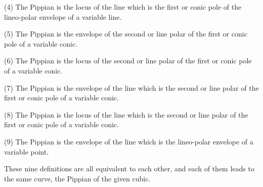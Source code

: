 \documentclass[12pt,a4paper]{article}
\theoremstyle{definition}
\begin{document}
\hspace*{2em}(4) The Pippian is the locus of the line which is the first
or conic pole of the lineo-polar envelope of a variable line.

\hspace*{2em}(5) The Pippian is the envelope of the second or line polar
of the first or conic pole of a variable conic.

\hspace*{2em}(6) The Pippian is the locus of the second or line polar of
the first or conic pole of a variable conic.

\hspace*{2em}(7) The Pippian is the envelope of the line which is the
second or line polar of the first or conic pole of a variable conic.

\hspace*{2em}(8) The Pippian is the locus of the line which is the second
or line polar of the first or conic pole of a variable conic.

\hspace*{2em}(9) The Pippian is the envelope of the line which is the
lineo-polar envelope of a variable point.

\smallskip
These nine definitions are all equivalent to each other, and
each of them leads to the same curve, the Pippian of the given cubic.
\end{document}
